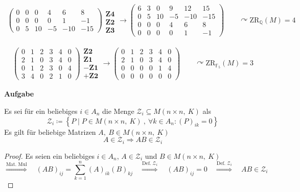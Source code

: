 \documentclass[a4paper, 12pt]{scrartcl}
\newcounter{taski}
\newcommand{\task}{\stepcounter{taski}\textbf{Aufgabe \arabic{taski}}}
\newcommand{\defimpl}[1]{\stackrel{\text{Def.}\;#1}{\Longrightarrow}}
\newcommand{\txtimpl}[1]{\stackrel{\text{#1}}{\Longrightarrow}}
\begin{document}
\begin{gather*}
\begin{pmatrix}
		0 & 0 & 0 & 4 & 6 & 8 \\
		0 & 0 & 0 & 0 & 1 & -1 \\
		0 & 5 & 10 & -5 & -10 & -15
	\end{pmatrix}\begin{matrix}
		\\\mathbf{Z4}\\\mathbf{Z2}\\\mathbf{Z3}
	\end{matrix}\rightarrow
	\begin{pmatrix}
		6 & 3 & 0 & 9 & 12 & 15 \\
		0 & 5 & 10 & -5 & -10 & -15 \\
		0 & 0 & 0 & 4 & 6 & 8 \\
		0 & 0 & 0 & 0 & 1 & -1
	\end{pmatrix} \qquad \curvearrowright \mathrm{ZR}_{\mathbb{Q}}(M) = 4
\end{gather*}

\begin{gather*}
	\begin{pmatrix}
		0 & 1 & 2 & 3 & 4 & 0 \\
		2 & 1 & 0 & 3 & 4 & 0 \\
		0 & 1 & 2 & 3 & 0 & 4 \\
		3 & 4 & 0 & 2 & 1 & 0
	\end{pmatrix}
	\begin{matrix}
		\mathbf{Z2}\\\mathbf{Z1}\\-\mathbf{Z1}\\+\mathbf{Z2}
	\end{matrix} \rightarrow
	\begin{pmatrix}
		0 & 1 & 2 & 3 & 4 & 0 \\
		2 & 1 & 0 & 3 & 4 & 0 \\
		0 & 0 & 0 & 0 & 1 & 4 \\
		0 & 0 & 0 & 0 & 0 & 0
	\end{pmatrix} \qquad \curvearrowright \mathrm{ZR}_{\mathbb{F}_5}(M) = 3
\end{gather*}

\setcounter{taski}{27}
\task

\begin{lemma}\label{daslemma}
	Es sei für ein beliebiges $i \in A_n$ die Menge $\mathcal{Z}_i \subseteq M(n \times n,\ K)$ als
	\[ \mathcal{Z}_i \coloneqq \left\{ P \mid P \in M(n \times n,\ K)\ ,\ \forall k \in A_n : (P)_{ik} = 0 \right\} \]
	Es gilt für beliebige Matrizen $A,\ B \in M(n \times n,\ K)$
	\[ A \in \mathcal{Z}_i \Rightarrow AB \in \mathcal{Z}_i \]
\end{lemma}
\begin{proof}
Es seien ein beliebiges $i \in A_n$, $A \in \mathcal{Z}_i$ und $B \in M(n \times n,\ K)$
\[ \txtimpl{Mat. Mul}\quad (AB)_{ij} = \sum_{k = 1}^n (A)_{ik}(B)_{kj} \quad\defimpl{\mathcal{Z}_i}\quad (AB)_{ij} = 0 \quad\defimpl{\mathcal{Z}_i}\quad AB \in \mathcal{Z}_i \]
\end{proof}
\end{document}
